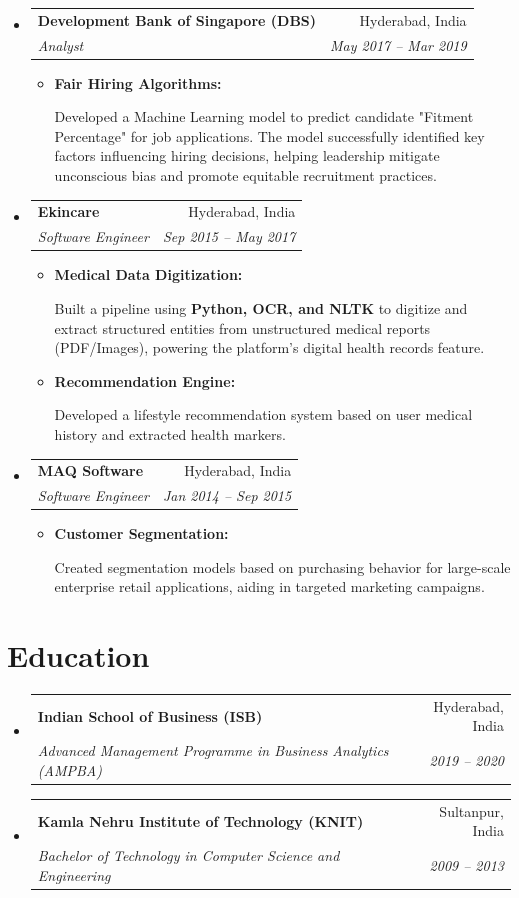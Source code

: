 \documentclass[10pt,a4paper]{article}
\makeatletter
\newcommand{\resumeItem}[1]{
  \item\small{
    {#1 \vspace{-2pt}}
  }
}
\newcommand{\resumeSubheading}[4]{
  \vspace{-1pt}\item
    \begin{tabular*}{0.97\textwidth}[t]{l@{\extracolsep{\fill}}r}
      \textbf{#1} & #2 \\
      \textit{\small#3} & \textit{\small #4} \\
    \end{tabular*}\vspace{-5pt}
}
\makeatother
\begin{document}
\begin{itemize}[leftmargin=0.15in, label={}]
  \resumeSubheading
      {Development Bank of Singapore (DBS)}{Hyderabad, India}
      {Analyst}{May 2017 -- Mar 2019}
      \begin{itemize}
        \resumeItem{\textbf{Fair Hiring Algorithms:}}
          {Developed a Machine Learning model to predict candidate "Fitment Percentage" for job applications. The model successfully identified key factors influencing hiring decisions, helping leadership mitigate unconscious bias and promote equitable recruitment practices.}
      \end{itemize}

  \resumeSubheading
      {Ekincare}{Hyderabad, India}
      {Software Engineer}{Sep 2015 -- May 2017}
      \begin{itemize}
        \resumeItem{\textbf{Medical Data Digitization:}}
          {Built a pipeline using \textbf{Python, OCR, and NLTK} to digitize and extract structured entities from unstructured medical reports (PDF/Images), powering the platform's digital health records feature.}
        \resumeItem{\textbf{Recommendation Engine:}}
          {Developed a lifestyle recommendation system based on user medical history and extracted health markers.}
      \end{itemize}

  \resumeSubheading
      {MAQ Software}{Hyderabad, India}
      {Software Engineer}{Jan 2014 -- Sep 2015}
      \begin{itemize}
        \resumeItem{\textbf{Customer Segmentation:}}
          {Created segmentation models based on purchasing behavior for large-scale enterprise retail applications, aiding in targeted marketing campaigns.}
      \end{itemize}

\end{itemize}

\section{Education}
\begin{itemize}[leftmargin=0.15in, label={}]
  \resumeSubheading
      {Indian School of Business (ISB)}{Hyderabad, India}
      {Advanced Management Programme in Business Analytics (AMPBA)}{2019 -- 2020}
  \resumeSubheading
      {Kamla Nehru Institute of Technology (KNIT)}{Sultanpur, India}
      {Bachelor of Technology in Computer Science and Engineering}{2009 -- 2013}
\end{itemize}
\end{document}
